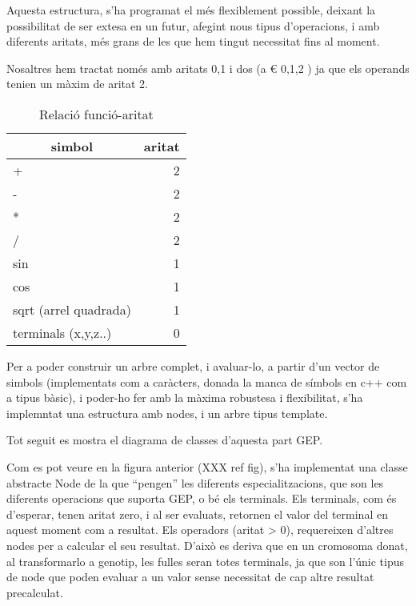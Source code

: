 \documentclass[titlepage,a4paper,12pt]{book}
\begin{document}
Aquesta estructura, s'ha programat el més flexiblement possible, deixant la
possibilitat de ser extesa en un futur, afegint nous tipus d'operacions, i amb
diferents aritats, més grans de les que hem tingut necessitat fins al moment.

Nosaltres hem tractat només amb aritats 0,1 i dos (a € {0,1,2} ) ja que els
operands tenien un màxim de aritat 2.



\begin{table}
\centering
\caption{Relació funció-aritat}
\begin{tabular}{|l|r|}
\hline
\multicolumn{1}{|c|}{\textbf{simbol }} & \multicolumn{1}{c|}{\textbf{ aritat}} \\
\hline
\hline
+                     & 2 \\
-                     & 2 \\
*                     & 2 \\
/                     & 2 \\
sin                   & 1 \\
cos                   & 1 \\
sqrt (arrel quadrada) & 1 \\
terminals (x,y,z..)   & 0 \\
\hline
\end{tabular}
\end{table}

Per a poder construir un arbre complet, i avaluar-lo, a partir d'un vector de
simbols (implementats com a caràcters, donada la manca de símbols en c++ com a
tipus bàsic), i poder-ho fer amb la màxima robustesa i flexibilitat, s'ha
implemntat una estructura amb nodes, i un arbre tipus template.

Tot seguit es mostra el diagrama de classes d'aquesta part GEP.


Com es pot veure en la figura anterior (XXX ref fig), s'ha implementat una
classe abstracte Node de la que ``pengen'' les diferents especialitzacions, que
son les diferents operacions que suporta GEP, o bé els terminals. Els terminals,
com és d'esperar, tenen aritat zero, i al ser evaluats, retornen el valor del
terminal en aquest moment com a resultat.  Els operadors (aritat > 0),
requereixen d'altres nodes per a calcular el seu resultat.  D'això es deriva que
en un cromosoma donat, al transformarlo a genotip, les fulles seran totes
terminals, ja que son l'únic tipus de node que poden evaluar a un valor sense
necessitat de cap altre resultat precalculat.
\end{document}
